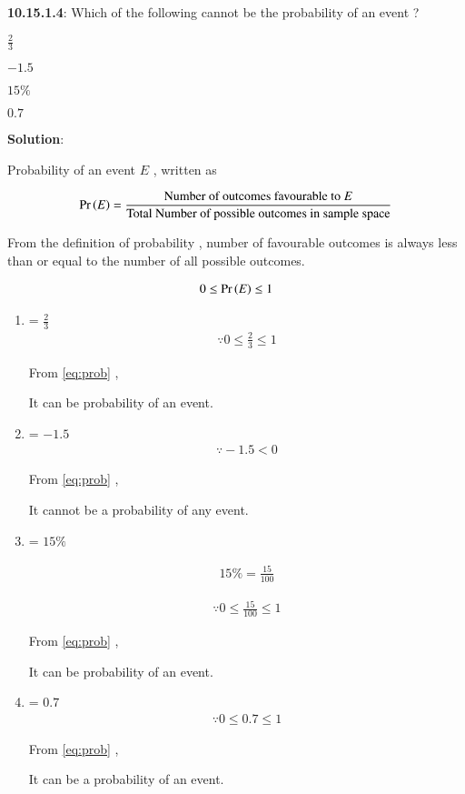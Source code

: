 \documentclass[journal,12pt,twocolumn]{IEEEtran}
\begin{document}
\noindent  \textbf{10.15.1.4}:
 Which of the following cannot be the probability of an event ? 

\begin{enumerate*}[label=(\Alph*)]
\item \(\frac23\) 
\item \(-1.5\) 
\item \(15\%\) 
\item \(0.7\) 
\end{enumerate*}


\noindent \textbf{Solution}:

Probability of an event $E$ , written as \:

\begin{align}
\label{eq:def}
\Pr\left(E\right)=\dfrac{\text{Number of outcomes favourable to $E$}}{\text{Total Number of possible outcomes in sample space}}
\end{align}


From the definition of probability , number of favourable outcomes is always less than or equal to the number of all possible outcomes.


\begin{align}
   \label{eq:prob}
   0 \le \Pr\left(E\right)\le 1 
\end{align}
\begin{enumerate}[label=(\Alph*)]
    

\item {} = \(\frac23\)
\begin{align}
    \because 0 \le \frac23 \le 1
\end{align}

From \eqref{eq:prob} ,

 It can be probability of an event.

\item {} = \(-1.5\)
\begin{align}
\because  -1.5 < 0 
\end{align}

From \eqref{eq:prob} ,

It cannot be a probability of any event.

\item {} = \(15\%\)

\begin{align}
15\%=\frac{15}{100}
\end{align}

\begin{align}
\because 0 \le \frac{15}{100} \le 1
\end{align}

From \eqref{eq:prob} ,

\indent It can be probability of an event.

\item {} = \(0.7\) 
\begin{align}
\because 0 \le 0.7 \le 1 
\end{align}

From \eqref{eq:prob} ,

It can be a probability of an event.
\end{enumerate}
\end{document}
